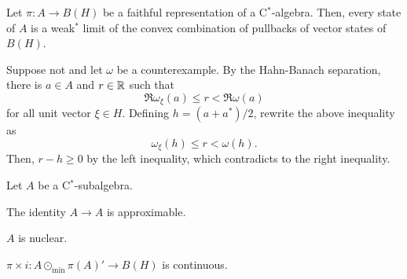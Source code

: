 \documentclass{../../../small}
\begin{document}
\begin{lem}
Let $\pi:A\to B(H)$ be a faithful representation of a C$^*$-algebra.
Then, every state of $A$ is a weak$^*$ limit of the convex combination of pullbacks of vector states of $B(H)$.
\end{lem}
\begin{pf}
Suppose not and let $\omega$ be a counterexample.
By the Hahn-Banach separation, there is $a\in A$ and $r\in\mathbb{R}$ such that
\[\Re\omega_\xi(a)\le r<\Re\omega(a)\]
for all unit vector $\xi\in H$.
Defining $h=(a+a^*)/2$, rewrite the above inequality as
\[\omega_\xi(h)\le r<\omega(h).\]
Then, $r-h\ge0$ by the left inequality, which contradicts to the right inequality.
\end{pf}

\begin{thm}
Let $A$ be a C$^*$-subalgebra.
\begin{parts}
\item The identity $A\to A$ is approximable.
\item $A$ is nuclear.
\item $\pi\times i:A\odot_{\min}\pi(A)'\to B(H)$ is continuous.
\end{parts}
\end{thm}
\end{document}
